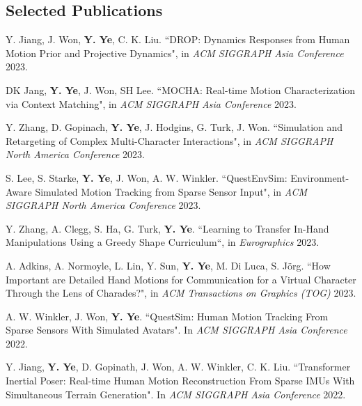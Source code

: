 \documentclass[margin,line]{res}
\begin{document}
\begin{resume}
\section{\sc Selected Publications}

Y. Jiang, J. Won, {\bf Y. Ye}, C. K. Liu. ``DROP: Dynamics Responses from Human Motion Prior and Projective Dynamics", in {\em ACM SIGGRAPH Asia Conference} 2023.

\vspace*{-.1in}
DK Jang, {\bf Y. Ye}, J. Won, SH Lee. ``MOCHA: Real-time Motion Characterization via Context Matching", in {\em ACM SIGGRAPH Asia Conference} 2023.

\vspace*{-.1in}
Y. Zhang, D. Gopinach, {\bf Y. Ye}, J. Hodgins, G. Turk, J. Won. ``Simulation and Retargeting of Complex Multi-Character Interactions", in {\em ACM SIGGRAPH North America Conference} 2023.

\vspace*{-.1in}
S. Lee, S. Starke, {\bf Y. Ye}, J. Won, A. W. Winkler. ``QuestEnvSim: Environment-Aware Simulated Motion Tracking from Sparse Sensor Input", in {\em ACM SIGGRAPH North America Conference} 2023.

\vspace*{-.1in}
Y. Zhang, A. Clegg, S. Ha, G. Turk, {\bf Y. Ye}. ``Learning to Transfer In-Hand Manipulations Using a Greedy Shape Curriculum``, in {\em Eurographics} 2023.

\vspace*{-.1in}
A. Adkins, A. Normoyle, L. Lin, Y. Sun, {\bf Y. Ye}, M. Di Luca, S. J\"{o}rg. ``How Important are Detailed Hand Motions for Communication for a Virtual Character Through the Lens of Charades?", in {\em ACM Transactions on Graphics (TOG)} 2023.


\vspace*{-.1in}
A. W. Winkler, J. Won, {\bf Y. Ye}. ``QuestSim: Human Motion Tracking From Sparse Sensors With Simulated Avatars". In {\em ACM SIGGRAPH Asia Conference} 2022.

\vspace*{-.1in}
Y. Jiang, {\bf Y. Ye}, D. Gopinath, J. Won, A. W. Winkler, C. K. Liu. ``Transformer Inertial Poser: Real-time Human Motion Reconstruction From Sparse IMUs With Simultaneous Terrain Generation". In {\em ACM SIGGRAPH Asia Conference} 2022.


\end{resume}
\end{document}
